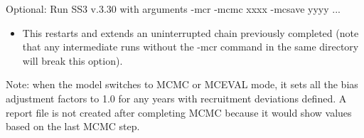 \noindent Optional: Run SS3 v.3.30 with arguments -mcr -mcmc xxxx -mcsave yyyy ...
\begin{itemize}
	\item This restarts and extends an uninterrupted chain previously completed (note that any intermediate runs without the -mcr command in the same directory will break this option).
\end{itemize}

Note: when the model switches to MCMC or MCEVAL mode, it sets all the bias adjustment factors to 1.0 for any years with recruitment deviations defined. A report file is not created after completing MCMC because it would show values based on the last MCMC step.

\pagebreak